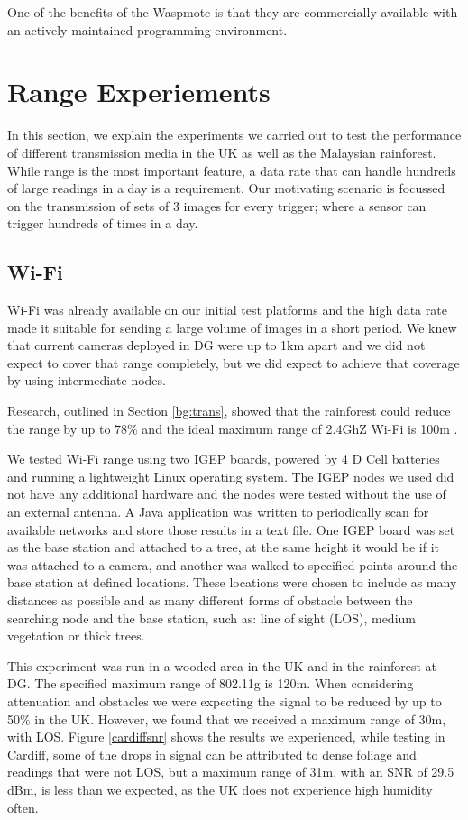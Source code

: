 One of the benefits of the Waspmote is that they are commercially available with an actively maintained programming environment.

\section{Range Experiements}\label{tech:wireless}
	In this section, we explain the experiments we carried out to test the performance of different transmission media in the UK as well as the Malaysian rainforest. While range is the most important feature, a data rate that can handle hundreds of large readings in a day is a requirement. Our motivating scenario is focussed on the transmission of sets of 3 images for every trigger; where a sensor can trigger hundreds of times in a day.

\subsection{Wi-Fi}\label{tech:wifirange}
Wi-Fi was already available on our initial test platforms and the high data rate made it suitable for sending a large volume of images in a short period. We knew that current cameras deployed in DG were up to 1km apart and we did not expect to cover that range completely, but we did expect to achieve that coverage by using intermediate nodes.

Research, outlined in Section \ref{bg:trans}, showed that the rainforest could reduce the range by up to 78\% and the ideal maximum range of 2.4GhZ Wi-Fi is 100m \cite{Dhawan2007}. 

We tested Wi-Fi range using two IGEP boards, powered by 4 D Cell batteries and running a lightweight Linux operating system.	The IGEP nodes we used did not have any additional hardware and the nodes were tested without the use of an external antenna. A Java application was written to periodically scan for available networks and store those results in a text file. One IGEP board was set as the base station and attached to a tree, at the same height it would be if it was attached to a camera, and another was walked to specified points around the base station at defined locations. These locations were chosen to include as many distances as possible and as many different forms of obstacle between the searching node and the base station, such as: line of sight (LOS), medium vegetation or thick trees.
			
This experiment was run in a wooded area in the UK and in the rainforest at DG. The specified maximum range of 802.11g is 120m. When considering attenuation and obstacles we were expecting the signal to be reduced by up to 50\% in the UK. However, we found that we received a maximum range of 30m, with LOS. Figure \ref{cardiffsnr} shows the results we experienced, while testing in Cardiff, some of the drops in signal can be attributed to dense foliage and readings that were not LOS, but a maximum range of 31m, with an SNR of 29.5 dBm, is less than we expected, as the UK does not experience high humidity often.
			
